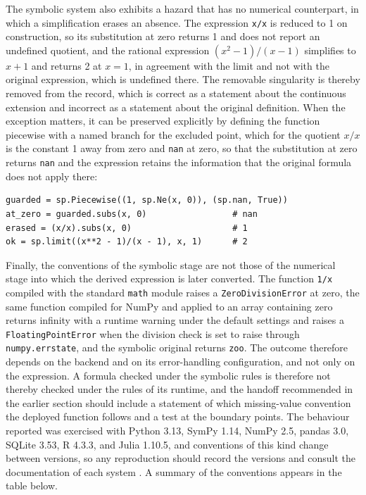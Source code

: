 \documentclass[11pt]{article}
\theoremstyle{remark}
\begin{document}
The symbolic system also exhibits a hazard that has no numerical counterpart, in which a simplification erases an absence. The expression \verb|x/x| is reduced to 1 on construction, so its substitution at zero returns 1 and does not report an undefined quotient, and the rational expression $(x^2-1)/(x-1)$ simplifies to $x+1$ and returns 2 at $x=1$, in agreement with the limit and not with the original expression, which is undefined there. The removable singularity is thereby removed from the record, which is correct as a statement about the continuous extension and incorrect as a statement about the original definition. When the exception matters, it can be preserved explicitly by defining the function piecewise with a named branch for the excluded point, which for the quotient $x/x$ is the constant 1 away from zero and \verb|nan| at zero, so that the substitution at zero returns \verb|nan| and the expression retains the information that the original formula does not apply there:
\begin{verbatim}
guarded = sp.Piecewise((1, sp.Ne(x, 0)), (sp.nan, True))
at_zero = guarded.subs(x, 0)                 # nan
erased = (x/x).subs(x, 0)                    # 1
ok = sp.limit((x**2 - 1)/(x - 1), x, 1)      # 2
\end{verbatim}
Finally, the conventions of the symbolic stage are not those of the numerical stage into which the derived expression is later converted. The function \verb|1/x| compiled with the standard \verb|math| module raises a \verb|ZeroDivisionError| at zero, the same function compiled for NumPy and applied to an array containing zero returns infinity with a runtime warning under the default settings and raises a \verb|FloatingPointError| when the division check is set to raise through \verb|numpy.errstate|, and the symbolic original returns \verb|zoo|. The outcome therefore depends on the backend and on its error-handling configuration, and not only on the expression. A formula checked under the symbolic rules is therefore not thereby checked under the rules of its runtime, and the handoff recommended in the earlier section should include a statement of which missing-value convention the deployed function follows and a test at the boundary points. The behaviour reported was exercised with Python 3.13, SymPy 1.14, NumPy 2.5, pandas 3.0, SQLite 3.53, R 4.3.3, and Julia 1.10.5, and conventions of this kind change between versions, so any reproduction should record the versions and consult the documentation of each system \cite{pandasna,sqlitenulls,numpyerrstate,juliamissing}. A summary of the conventions appears in the table below.
\end{document}
